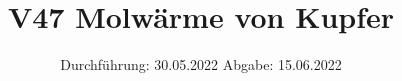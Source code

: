 

\subject{Fortgeschrittenenpraktikum}
\title{V47 Molwärme von Kupfer}
\date{%
  Durchführung: 30.05.2022
  \hspace{3em}
  Abgabe: 15.06.2022
}



\maketitle
\thispagestyle{empty}
\tableofcontents
\newpage








\printbibliography{}




